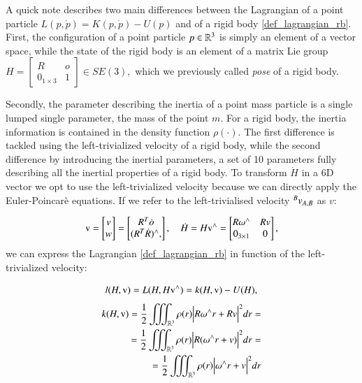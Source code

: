 A quick note describes two main differences between the Lagrangian of a point particle $L(p,\dot{p}) = K(p, \dot{p}) - U(p)$ and of a rigid body \ref{def_lagrangian_rb}. First, the configuration of a point particle $p \in \mathbb{R}^{3}$ is simply an element of a vector space, while the state of the rigid
body is an element of a matrix Lie group 
$
H = \begin{bmatrix}
    R & o\\
    0_{1\times3} & 1
\end{bmatrix} \in SE(3),
$
which we previously called \textit{pose} of a rigid body.

Secondly, the parameter describing the inertia of a point mass particle is a single lumped single parameter, the mass of the point $m$. For a rigid body, the inertia information is contained in the density function $\rho(\cdot)$.
The first difference is tackled using the left-trivialized velocity of a rigid body, while the second difference by introducing the inertial parameters, a set of 10 parameters fully describing all the inertial properties of a rigid body.
To transform $\dot{H}$ in a 6D vector we opt to use the left-trivialized velocity because we can directly apply the Euler-Poincarè equations.
If we refer to the left-trivialised velocity ${}^{B}{v}_{A,B}$ as $v$:

\begin{equation} \label{left_trivialised_velocity_lagrangian}
    \text{v} = \begin{bmatrix}
        v\\w
    \end{bmatrix} = 
    \begin{bmatrix}
        R^T\dot{o}\\
        (R^T\dot{R})^{\wedge},
    \end{bmatrix},
    \quad
    \dot{H}=H\text{v}^{\wedge}=
    \begin{bmatrix}
        R\omega^{\wedge} & Rv\\
        0_{3\times1} & 0
    \end{bmatrix},
\end{equation}
we can express the Lagrangian \ref{def_lagrangian_rb} in function of the left-trivialized
velocity:


\begin{equation} \label{left_trivialised_lagrangian}
    l(H, \text{v}) = L(H, H\text{v}^{\wedge}) = k(H,\text{v}) - U(H),
\end{equation}
\begin{equation}\label{left_trivialised_kinetic_energy}
    \begin{split}
        k(H, \text{v}) = \frac{1}{2}\iiint_{\mathbb{R}^3} \rho(r) \Big| R\omega^{\wedge}r + Rv \Big|^2 dr =\\ =\frac{1}{2}\iiint_{\mathbb{R}^3} \rho(r) \Big| R(\omega^{\wedge}r + v  ) \Big|^2 dr =\\= \frac{1}{2}\iiint_{\mathbb{R}^3} \rho(r) \Big| \omega^{\wedge}r + v \Big|^2 dr
    \end{split}
\end{equation}

